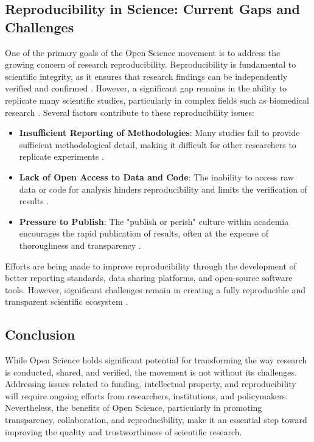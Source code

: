 \documentclass{article}
\begin{document}
\subsection{Reproducibility in Science: Current Gaps and Challenges}
One of the primary goals of the Open Science movement is to address the growing concern of research reproducibility. Reproducibility is fundamental to scientific integrity, as it ensures that research findings can be independently verified and confirmed \cite{Nosek2015}. However, a significant gap remains in the ability to replicate many scientific studies, particularly in complex fields such as biomedical research \cite{Borgman2012}. Several factors contribute to these reproducibility issues:
\begin{itemize}
    \item \textbf{Insufficient Reporting of Methodologies}: Many studies fail to provide sufficient methodological detail, making it difficult for other researchers to replicate experiments \cite{Leonelli2016}.
    \item \textbf{Lack of Open Access to Data and Code}: The inability to access raw data or code for analysis hinders reproducibility and limits the verification of results \cite{Piwowar2011}.
    \item \textbf{Pressure to Publish}: The "publish or perish" culture within academia encourages the rapid publication of results, often at the expense of thoroughness and transparency \cite{Boulton2015}.
\end{itemize}

Efforts are being made to improve reproducibility through the development of better reporting standards, data sharing platforms, and open-source software tools. However, significant challenges remain in creating a fully reproducible and transparent scientific ecosystem \cite{Nosek2015}.

\subsection{Conclusion}
While Open Science holds significant potential for transforming the way research is conducted, shared, and verified, the movement is not without its challenges. Addressing issues related to funding, intellectual property, and reproducibility will require ongoing efforts from researchers, institutions, and policymakers. Nevertheless, the benefits of Open Science, particularly in promoting transparency, collaboration, and reproducibility, make it an essential step toward improving the quality and trustworthiness of scientific research.
\end{document}

